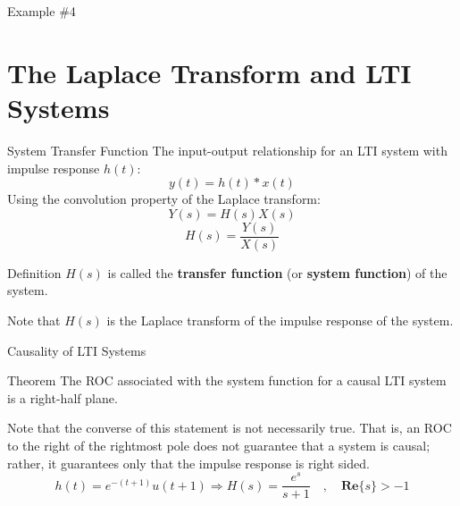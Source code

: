 \documentclass[aspectratio=169]{beamer}
\begin{document}
\begin{frame}{Example \#4}

\end{frame}


\section{The Laplace Transform and LTI Systems}
\begin{frame}{System Transfer Function}
	The input-output relationship for an LTI system with impulse response $ h(t) $:
	\[y(t) = h(t)*x(t)\]
	Using the convolution property of the Laplace transform:
	\[Y(s) = H(s)X(s)\]
	\[H(s) = \frac{Y(s)}{X(s)}\]
	\begin{block}{Definition}
		$ H(s) $ is called the \textbf{transfer function} (or \textbf{system function}) of the system.
	\end{block}
	Note that $ H(s) $ is the Laplace transform of the impulse response of the system.
\end{frame}

\begin{frame}{Causality of LTI Systems}
	\begin{block}{Theorem}
		The ROC associated with the system function for a
causal LTI system is a right-half plane.
	\end{block}
Note that the converse of this statement is not necessarily true. That is, an ROC to the right of the rightmost pole does not guarantee that a system is causal; rather, it guarantees only that the impulse
response is right sided.\\

\[h(t) = e^{-(t+1)}u(t+1)\Rightarrow H(s) = \frac{e^s}{s+1} \quad,\quad \mathbf{Re}\{s\}>-1\]


\end{frame}
\end{document}
